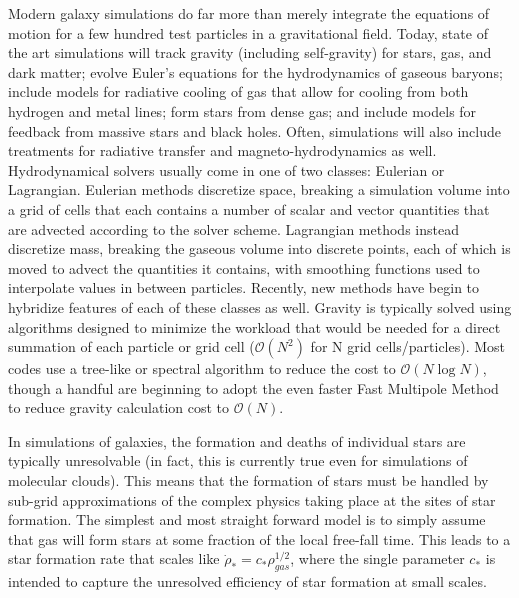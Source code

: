 Modern galaxy simulations do far more than merely integrate the equations of
motion for a few hundred test particles in a gravitational field.  Today, state
of the art simulations will track gravity (including self-gravity) for stars,
gas, and dark matter; evolve Euler's equations for the hydrodynamics of gaseous
baryons; include models for radiative cooling of gas that allow for cooling from
both hydrogen and metal lines; form stars from dense gas; and include models for
feedback from massive stars and black holes.  Often, simulations will also
include treatments for radiative transfer and magneto-hydrodynamics as well.
Hydrodynamical solvers usually come in one of two classes: Eulerian or
Lagrangian.  Eulerian methods discretize space, breaking a simulation volume
into a grid of cells that each contains a number of scalar and vector quantities
that are advected according to the solver scheme.  Lagrangian methods instead
discretize mass, breaking the gaseous volume into discrete points, each of which
is moved to advect the quantities it contains, with smoothing functions used to
interpolate values in between particles.  Recently, new methods have begin to
hybridize features of each of these classes as well. Gravity is typically solved
using algorithms designed to minimize the workload that would be needed for a
direct summation of each particle or grid cell ($\mathcal{O}(N^2)$ for N grid
cells/particles).  Most codes use a tree-like or spectral algorithm to reduce
the cost to $\mathcal{O}(N\log{N})$, though a handful are beginning to adopt the
even faster Fast Multipole Method to reduce gravity calculation cost to
$\mathcal{O}(N)$.

In simulations of galaxies, the formation and deaths of individual stars are
typically unresolvable (in fact, this is currently true even for simulations of
molecular clouds).  This means that the formation of stars must be handled by
sub-grid approximations of the complex physics taking place at the sites of star
formation.  The simplest and most straight forward model is to simply assume
that gas will form stars at some fraction of the local free-fall time.  This leads
to a star formation rate that scales like $\dot \rho_* = c_* \rho_{gas}^{1/2}$,
where the single parameter $c_*$ is intended to capture the unresolved
efficiency of star formation at small scales.  

